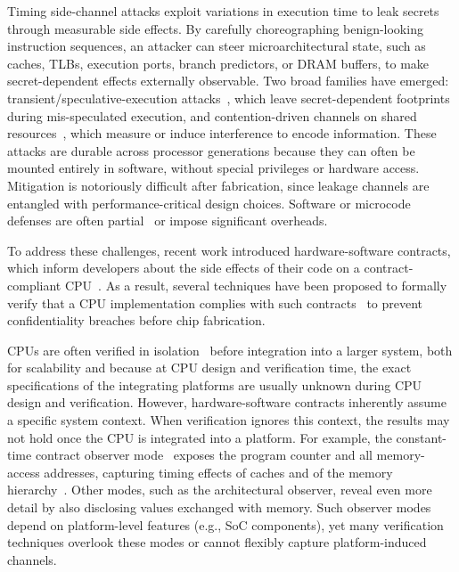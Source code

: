 
Timing side-channel attacks exploit variations in execution time to leak secrets through measurable side effects.
By carefully choreographing benign-looking instruction sequences, an attacker can steer microarchitectural state, such as caches, TLBs, execution ports, branch predictors, or DRAM buffers, to make secret-dependent effects externally observable.
Two broad families have emerged: transient/speculative-execution attacks~\cite{kocher2019spectre,lipp2018meltdown,canella2019fallout,schwarz2019zombieload,van2019ridl,van2021cacheout,ragab2021rage,wikner2022retbleed,trujillo2023inception,wikner2023phantom,wikner2024breaking,wikner2025bpi}, which leave secret-dependent footprints during mis-speculated execution, and contention-driven channels on shared resources~\cite{bernstein2005cache,Liu2015LLC,YaromFalkner2014FlushReload,Yarom2016CacheBleed,Moghimi2018MemJam,Gruss2016PrefetchSCA,Pessl2016DRAMA}, which measure or induce interference to encode information.
These attacks are durable across processor generations because they can often be mounted entirely in software, without special privileges or hardware access.
Mitigation is notoriously difficult after fabrication, since leakage channels are entangled with performance-critical design choices.
Software or microcode defenses are often partial~\cite{ridlad} or impose significant overheads.

To address these challenges, recent work introduced hardware-software contracts, which inform developers about the side effects of their code on a contract-compliant CPU~\cite{guarnieri2021hardware,oleksenko2022revizor}.
As a result, several techniques have been proposed to formally verify that a CPU implementation complies with such contracts~\cite{dinesh2024conjunct,dinesh2025h,ceesay2024mucfi,wang2023specification,tan2025contractshadowlogic,hsiao2024rtl2mmupath} to prevent confidentiality breaches before chip fabrication.

CPUs are often verified in isolation~\cite{dinesh2024conjunct,dinesh2025h,ceesay2024mucfi,wang2023specification,tan2025contractshadowlogic,hsiao2024rtl2mmupath} before integration into a larger system, both for scalability and because at CPU design and verification time, the exact specifications of the integrating platforms are usually unknown during CPU design and verification.
However, hardware-software contracts inherently assume a specific system context. When verification ignores this context, the results may not hold once the CPU is integrated into a platform.
For example, the constant-time contract observer mode~\cite{guarnieri2021hardware} exposes the program counter and all memory-access addresses, capturing timing effects of caches and of the memory hierarchy~\cite{guarnieri2021hardware,oleksenko2022revizor}.
Other modes, such as the architectural observer, reveal even more detail by also disclosing values exchanged with memory.
Such observer modes depend on platform-level features (e.g., SoC components), yet many verification techniques overlook these modes or cannot flexibly capture platform-induced channels.

